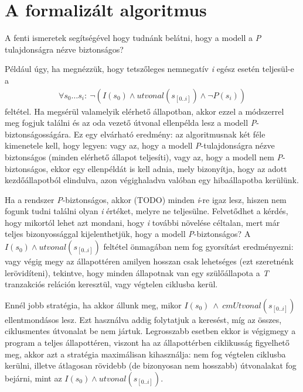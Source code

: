 \section{A formalizált algoritmus}
\label{sec:formalizalt_alg}

A fenti ismeretek segítségével hogy tudnánk belátni, hogy a modell a \emph{P} tulajdonságra nézve biztonságos?

Például úgy, ha megnézzük, hogy tetszőleges nemnegatív \emph{i} egész esetén teljesül-e a
\begin{align}
	\forall s_{0} \dots s_{i}:~\neg(I(s_{0}) \wedge utvonal(s_{[0..i]}) \wedge \neg P(s_{i}))
\end{align}
feltétel. Ha megsérül valamelyik elérhető állapotban, akkor ezzel a módszerrel meg fogjuk találni és az oda vezető útvonal ellenpélda lesz a modell \emph{P}-biztonságosságára. Ez egy elvárható eredmény: az algoritmusnak két féle kimenetele kell, hogy legyen: vagy az, hogy a modell \emph{P}-tulajdonságra nézve biztonságos (minden elérhető állapot teljesíti), vagy az, hogy a modell nem \emph{P}-biztonságos, ekkor egy ellenpéldát is kell adnia, mely bizonyítja, hogy az adott kezdőállapotból elindulva, azon végighaladva valóban egy hibaállapotba kerülünk.

Ha a rendszer \emph{P}-biztonságos, akkor (TODO) minden \emph{i}-re igaz lesz, hiszen nem fogunk tudni találni olyan \emph{i} értéket, melyre ne teljesülne. Felvetődhet a kérdés, hogy mikortól lehet azt mondani, hogy \emph{i} további növelése céltalan, mert már teljes bizonyossággal kijelenthetjük, hogy a modell \emph{P}-biztonságos? A $I(s_{0}) \wedge utvonal(s_{[0..i]})$ feltétel önmagában nem fog gyorsítást eredményezni: vagy végig megy az állapottéren amilyen hosszan csak lehetséges (ezt szeretnénk lerövidíteni), tekintve, hogy minden állapotnak van egy szülőállapota a \emph{T} tranzakciós reláción keresztül, vagy végtelen ciklusba kerül.

Ennél jobb stratégia, ha akkor állunk meg, mikor $I(s_{0})~\wedge~ cmUtvonal(s_{[0..i]})$ ellentmondásos lesz. Ezt használva addig folytatjuk a keresést, míg az összes, ciklusmentes útvonalat be nem jártuk. Legrosszabb esetben ekkor is végigmegy a program a teljes állapottéren, viszont ha az állapottérben ciklikusság figyelhető meg, akkor azt a stratégia maximálisan kihasználja: nem fog végtelen ciklusba kerülni, illetve átlagosan rövidebb (de bizonyosan nem hosszabb) útvonalakat fog bejárni, mint az $I(s_{0}) \wedge utvonal(s_{[0..i]})$.

